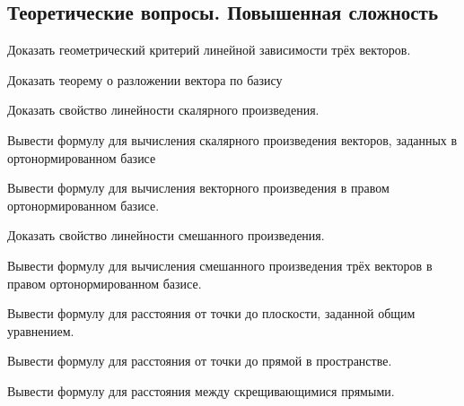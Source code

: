 \subsection{Теоретические вопросы. Повышенная сложность}

\begin{question}
  Доказать геометрический критерий линейной зависимости трёх векторов.
\end{question}

\begin{question}
  Доказать теорему о разложении вектора по базису
\end{question}

\begin{question}
  Доказать свойство линейности скалярного произведения.
\end{question}

\begin{question}
  Вывести формулу для вычисления скалярного произведения векторов, заданных в ортонормированном базисе
\end{question}

\begin{question}
  Вывести формулу для вычисления векторного произведения в правом ортонормированном базисе.
\end{question}

\begin{question}
  Доказать свойство линейности смешанного произведения.
\end{question}

\begin{question}
  Вывести формулу для вычисления смешанного произведения трёх векторов в правом ортонормированном базисе.
\end{question}

\begin{question}
  Вывести формулу для расстояния от точки до плоскости, заданной общим уравнением.
\end{question}

\begin{question}
  Вывести формулу для расстояния от точки до прямой в пространстве.
\end{question}

\begin{question}
  Вывести формулу для расстояния между скрещивающимися прямыми.
\end{question}

